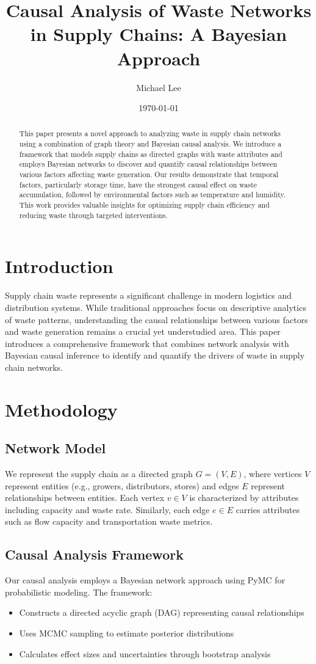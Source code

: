 \documentclass[12pt]{article}
\title{Causal Analysis of Waste Networks in Supply Chains: A Bayesian Approach}
\author{Michael Lee}
\date{\today}
\begin{document}
\maketitle

\begin{abstract}
This paper presents a novel approach to analyzing waste in supply chain networks using a combination of graph theory and Bayesian causal analysis. We introduce a framework that models supply chains as directed graphs with waste attributes and employs Bayesian networks to discover and quantify causal relationships between various factors affecting waste generation. Our results demonstrate that temporal factors, particularly storage time, have the strongest causal effect on waste accumulation, followed by environmental factors such as temperature and humidity. This work provides valuable insights for optimizing supply chain efficiency and reducing waste through targeted interventions.
\end{abstract}

\section{Introduction}
Supply chain waste represents a significant challenge in modern logistics and distribution systems. While traditional approaches focus on descriptive analytics of waste patterns, understanding the causal relationships between various factors and waste generation remains a crucial yet understudied area. This paper introduces a comprehensive framework that combines network analysis with Bayesian causal inference to identify and quantify the drivers of waste in supply chain networks.

\section{Methodology}
\subsection{Network Model}
We represent the supply chain as a directed graph $G = (V, E)$, where vertices $V$ represent entities (e.g., growers, distributors, stores) and edges $E$ represent relationships between entities. Each vertex $v \in V$ is characterized by attributes including capacity and waste rate. Similarly, each edge $e \in E$ carries attributes such as flow capacity and transportation waste metrics.

\subsection{Causal Analysis Framework}
Our causal analysis employs a Bayesian network approach using PyMC for probabilistic modeling. The framework:
\begin{itemize}
    \item Constructs a directed acyclic graph (DAG) representing causal relationships
    \item Uses MCMC sampling to estimate posterior distributions
    \item Calculates effect sizes and uncertainties through bootstrap analysis
\end{itemize}
\end{document}
